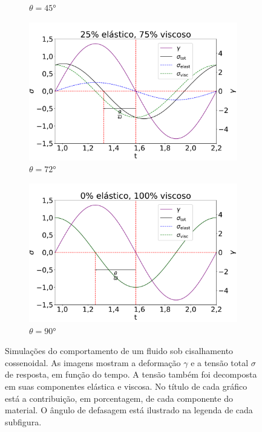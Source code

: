 \begin{figure}[h]
\begin{subfigure}[t]{0.3\textwidth}
					\caption{\(\theta=45°\)}
					\label{fig:osc_sim50}
				\end{subfigure}
			
				\hspace{2.5cm} \begin{subfigure}[t]{0.3\textwidth}
					\centering
					\includegraphics[width=\textwidth]{./imagens/reologia/Simulacao_visc_75}
					\caption{\(\theta=72°\)}
					\label{fig:osc_sim75}
				\end{subfigure}%
				\begin{subfigure}[t]{0.3\textwidth}
					\centering
					\includegraphics[width=\textwidth]{./imagens/reologia/Simulacao_visc_100}
					\caption{\(\theta=90°\)}
					\label{fig:osc_sim100}
				\end{subfigure}%
			\caption{Simulações do comportamento de um fluido sob cisalhamento cossenoidal. As imagens mostram a deformação \(\gamma\) e a tensão total \(\sigma\) de resposta, em função do tempo. A tensão também foi decomposta em suas componentes elástica e viscosa. No título de cada gráfico está a contribuição, em porcentagem, de cada componente do material. O ângulo de defasagem está ilustrado na legenda de cada subfigura.}
			\label{fig:osc_simulacoes}
			\end{figure} 
			
